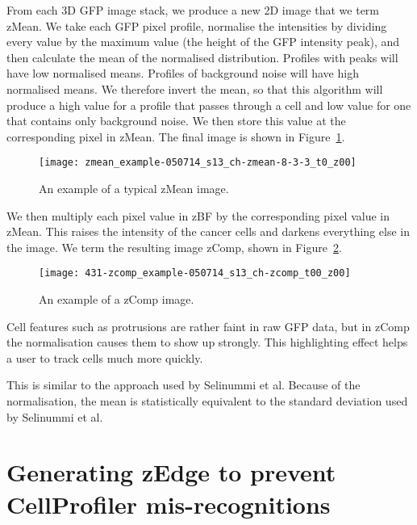 From each 3D GFP image stack, we produce a new 2D image that we term zMean. We take each GFP pixel profile, normalise the intensities by dividing every value by the maximum value (the height of the GFP intensity peak), and then calculate the mean of the normalised distribution. Profiles with peaks will have low normalised means. Profiles of background noise will have high normalised means. We therefore invert the mean, so that this algorithm will produce a high value for a profile that passes through a cell and low value for one that contains only background noise. We then store this value at the corresponding pixel in zMean. The final image is shown in Figure~\ref{fig:zmean_example}.

\begin{figure}[htbp!]
\centering
\texttt{[image: zmean\_example-050714\_s13\_ch-zmean-8-3-3\_t0\_z00]}
\caption[zMean image example]{An example of a typical zMean image.}
\label{fig:zmean_example}
\end{figure}

We then multiply each pixel value in zBF by the corresponding pixel value in zMean. This raises the intensity of the cancer cells and darkens everything else in the image. We term the resulting image zComp, shown in Figure~\ref{fig:zcomp}.

\begin{figure}[htbp!]
\centering
\texttt{[image: 431-zcomp\_example-050714\_s13\_ch-zcomp\_t00\_z00]}
\caption[zComp image sample]{An example of a zComp image.}
\label{fig:zcomp}
\end{figure}

Cell features such as protrusions are rather faint in raw GFP data, but in zComp the normalisation causes them to show up strongly. This highlighting effect helps a user to track cells much more quickly.

This is similar to the approach used by Selinummi et al. Because of the normalisation, the mean is statistically equivalent to the standard deviation used by Selinummi et al.

\section{Generating zEdge to prevent CellProfiler mis-recognitions}

